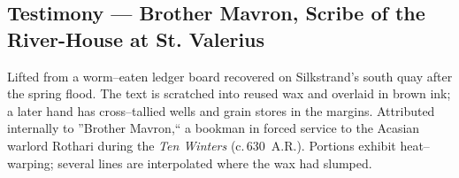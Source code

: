 \documentclass[11pt]{article}
\begin{document}
\clearpage

\subsection{Testimony --- Brother Mavron, Scribe of the River-House at St. Valerius}
\label{ms:mavron-testimony}

\begin{tcolorbox}[enhanced,breakable,
  colback=royal!3, colframe=royal!70!black, boxrule=0.6pt,
  left=6pt, right=6pt, top=6pt, bottom=6pt,
  title={Provenance}]
\label{prov:mavron}
\small
Lifted from a worm--eaten ledger board recovered on Silkstrand's south quay after the spring flood. 
The text is scratched into reused wax and overlaid in brown ink; a later hand has cross--tallied wells and grain stores in the margins. 
Attributed internally to ''Brother Mavron,`` a bookman in forced service to the Acasian warlord Rothari during the \emph{Ten Winters} (c.\,630~A.R.). 
Portions exhibit heat--warping; several lines are interpolated where the wax had slumped.
\end{tcolorbox}
\end{document}
